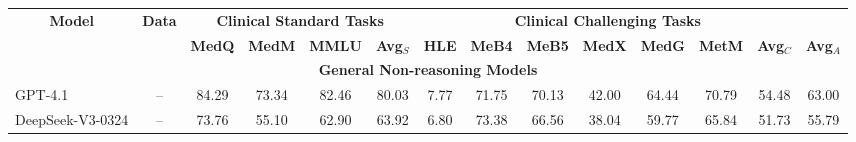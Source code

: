 \small
\begin{adjustbox}{max width=1.0\textwidth}
\begin{tabular}{llcccccccccccc}
\toprule
\multicolumn{1}{c}{\multirow{2}{*}{\textbf{Model}}} & \multicolumn{1}{c}{\multirow{2}{*}{\textbf{Data}}} & \multicolumn{4}{c}{\textbf{Clinical Standard Tasks}}                                                                                             & \multicolumn{7}{c}{\textbf{Clinical Challenging Tasks}}                                                                                                                                                                                                     &                                      \\ \cmidrule(l){3-14}
\multicolumn{1}{c}{}                                & \multicolumn{1}{c}{}                               & \multicolumn{1}{l}{\textbf{MedQ}} & \multicolumn{1}{l}{\textbf{MedM}} & \multicolumn{1}{l}{\textbf{MMLU}} & \multicolumn{1}{l}{\textbf{Avg$_S$}} & \multicolumn{1}{l}{\textbf{HLE}} & \multicolumn{1}{l}{\textbf{MeB4}} & \multicolumn{1}{l}{\textbf{MeB5}} & \multicolumn{1}{l}{\textbf{MedX}} & \multicolumn{1}{l}{\textbf{MedG}} & \multicolumn{1}{l}{\textbf{MetM}} & \multicolumn{1}{l}{\textbf{Avg$_C$}} & \multicolumn{1}{l}{\textbf{Avg$_A$}} \\ \midrule
\multicolumn{14}{c}{\textbf{General Non-reasoning Models}}                                                                                                                                                                                                                                                                                                                                                                                                                                                                                                       \\ \midrule
GPT-4.1                                             & \multicolumn{1}{c}{--}                             & 84.29                             & 73.34                             & 82.46                             & 80.03                                & 7.77                             & 71.75                             & 70.13                             & 42.00                             & 64.44                             & 70.79                             & 54.48                                & 63.00                                \\
DeepSeek-V3-0324                                    & \multicolumn{1}{c}{--}                             & 73.76                             & 55.10                             & 62.90                             & 63.92                                & 6.80                             & 73.38                             & 66.56                             & 38.04                             & 59.77                             & 65.84                             & 51.73                                & 55.79                                \\

\end{tabular}
\end{adjustbox}
